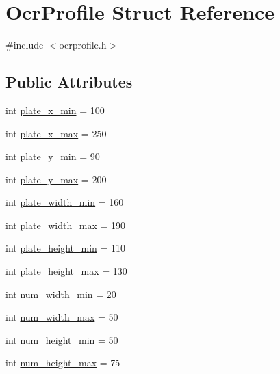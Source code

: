 \hypertarget{struct_ocr_profile}{}\section{Ocr\+Profile Struct Reference}
\label{struct_ocr_profile}


{\ttfamily \#include $<$ocrprofile.\+h$>$}

\subsection*{Public Attributes}
\begin{DoxyCompactItemize}
\item 
int \mbox{\hyperlink{struct_ocr_profile_ae56e709bcaceff2f934d044d604d88b5}{plate\+\_\+x\+\_\+min}} = 100
\item 
int \mbox{\hyperlink{struct_ocr_profile_a9dbeae2c4d98e35544e27fddbee1c87f}{plate\+\_\+x\+\_\+max}} = 250
\item 
int \mbox{\hyperlink{struct_ocr_profile_a484eb61bf662829fab9a5a01da3c6fad}{plate\+\_\+y\+\_\+min}} = 90
\item 
int \mbox{\hyperlink{struct_ocr_profile_a1dc6c83e22df80a43c4f29d142e6d3a0}{plate\+\_\+y\+\_\+max}} = 200
\item 
int \mbox{\hyperlink{struct_ocr_profile_ace4677abf62d4daede0747c1d45857aa}{plate\+\_\+width\+\_\+min}} = 160
\item 
int \mbox{\hyperlink{struct_ocr_profile_a6844f3386fc26c447df47533b2d1b653}{plate\+\_\+width\+\_\+max}} = 190
\item 
int \mbox{\hyperlink{struct_ocr_profile_a1d7c5806410d1716cf55be31e3625288}{plate\+\_\+height\+\_\+min}} = 110
\item 
int \mbox{\hyperlink{struct_ocr_profile_a188e7754051660595e868a5d24165f24}{plate\+\_\+height\+\_\+max}} = 130
\item 
int \mbox{\hyperlink{struct_ocr_profile_adff4d0e700c65ec5aa18bb30832eee9e}{num\+\_\+width\+\_\+min}} = 20
\item 
int \mbox{\hyperlink{struct_ocr_profile_ad15d282d7d634083cab46f56d96dbf39}{num\+\_\+width\+\_\+max}} = 50
\item 
int \mbox{\hyperlink{struct_ocr_profile_afcdcef83971364114b707fbce6ab0ac6}{num\+\_\+height\+\_\+min}} = 50
\item 
int \mbox{\hyperlink{struct_ocr_profile_a3d45a883fb8b19ed1ca2cd836c72da1c}{num\+\_\+height\+\_\+max}} = 75
\end{DoxyCompactItemize}



